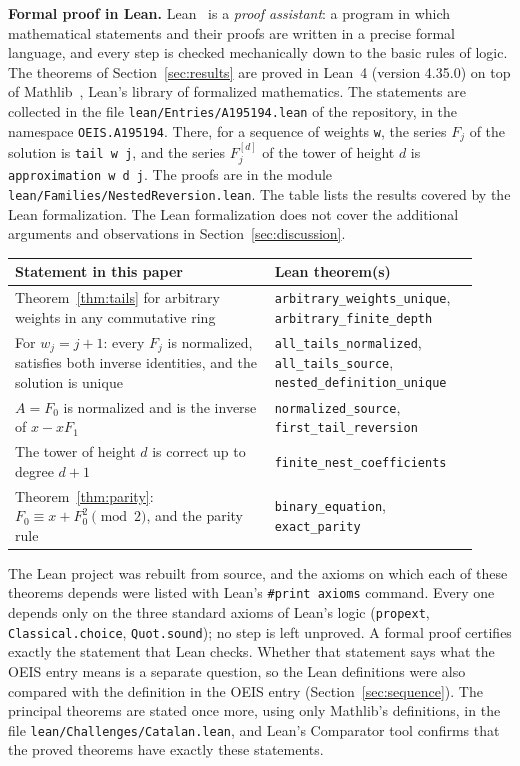 \documentclass[11pt,a4paper]{article}
\theoremstyle{definition}
\theoremstyle{remark}
\newcommand{\para}[1]{\par\medskip\noindent\textbf{#1}\enspace}
\begin{document}
\para{Formal proof in Lean.}
Lean~\cite{lean} is a \emph{proof assistant}: a program in which mathematical statements and their proofs are written
in a precise formal language, and every step is checked mechanically down to the basic rules of logic. The theorems of Section~\ref{sec:results} are proved in Lean~4 (version 4.35.0) on top of
Mathlib~\cite{mathlib}, Lean's library of formalized mathematics. The statements are collected in the file \texttt{lean/Entries/A195194.lean} of the repository,
in the namespace \texttt{OEIS.A195194}. There, for a sequence of weights \texttt{w}, the series $F_j$ of the solution is \texttt{tail w j}, and the series $F^{[d]}_j$ of the tower of height $d$ is \texttt{approximation w d j}. The proofs are in the module \texttt{lean/Families/NestedReversion.lean}.
The table lists the results covered by the Lean formalization. The Lean formalization does not cover the additional arguments and observations in Section~\ref{sec:discussion}.
\begin{center}\small\renewcommand{\arraystretch}{1.25}
\begin{tabular}{>{\raggedright\arraybackslash}p{0.52\linewidth}>{\raggedright\arraybackslash}p{0.4\linewidth}}
\toprule
Statement in this paper & Lean theorem(s)\\
\midrule
Theorem~\ref{thm:tails} for arbitrary weights in any commutative ring & \texttt{arbitrary\_\allowbreak{}weights\_\allowbreak{}unique}, \texttt{arbitrary\_\allowbreak{}finite\_\allowbreak{}depth} \\
For $w_j=j+1$: every $F_j$ is normalized, satisfies both inverse identities, and the solution is unique & \texttt{all\_\allowbreak{}tails\_\allowbreak{}normalized}, \texttt{all\_\allowbreak{}tails\_\allowbreak{}source}, \texttt{nested\_\allowbreak{}definition\_\allowbreak{}unique} \\
$A=F_0$ is normalized and is the inverse of $x-xF_1$ & \texttt{normalized\_\allowbreak{}source}, \texttt{first\_\allowbreak{}tail\_\allowbreak{}reversion} \\
The tower of height $d$ is correct up to degree $d+1$ & \texttt{finite\_\allowbreak{}nest\_\allowbreak{}coefficients} \\
Theorem~\ref{thm:parity}: $F_0\equiv x+F_0^2\pmod2$, and the parity rule & \texttt{binary\_\allowbreak{}equation}, \texttt{exact\_\allowbreak{}parity} \\
\bottomrule
\end{tabular}
\end{center}
The Lean project was rebuilt from source, and the axioms on which each of these theorems depends were listed with
Lean's \texttt{\#print axioms} command. Every one depends only on the three standard axioms of Lean's logic
(\texttt{propext}, \texttt{Classical.choice}, \texttt{Quot.sound}); no step is left unproved. A formal proof certifies
exactly the statement that Lean checks. Whether that statement says what the OEIS entry means is a separate question,
so the Lean definitions were also compared with the definition in the OEIS entry
(Section~\ref{sec:sequence}). The principal theorems are stated once more, using only Mathlib's definitions, in the
file \texttt{lean/Challenges/Catalan.lean}, and Lean's Comparator tool confirms that the
proved theorems have exactly these statements.
\end{document}
